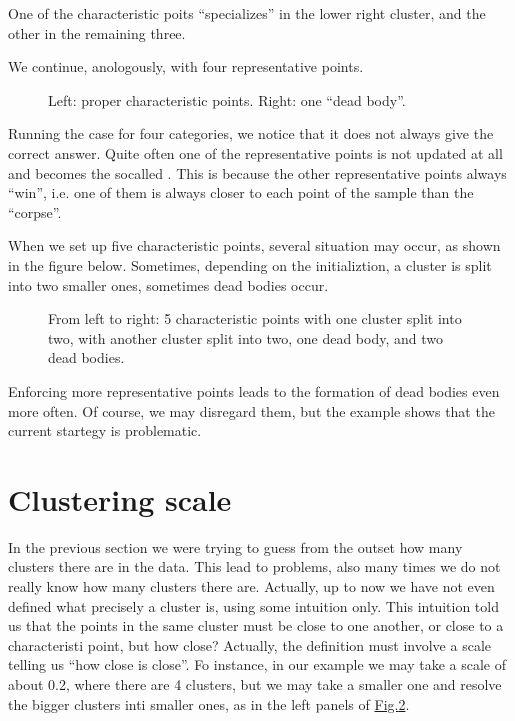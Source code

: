 \documentclass[letterpaper,10pt,english]{jupyterBook}
\let\sphinxpxdimen\pdfpxdimen\else\newdimen\sphinxpxdimen
\begin{document}
\noindent{}

\sphinxAtStartPar
One of the characteristic poits “specializes” in the lower right cluster, and the other in the remaining three.

\sphinxAtStartPar
We continue, anologously, with four representative points.

\begin{figure}[htbp]
\centering
\capstart

\noindent\sphinxincludegraphics[width=500\sphinxpxdimen]{{cl4_2}.jpg}
\caption{Left: proper characteristic points. Right: one “dead body”.}\label{\detokenize{docs/unsupervised:p-fig}}\end{figure}

\sphinxAtStartPar
Running the case for four categories, we notice that it does not always give the correct answer. Quite often one of the representative points is not updated at all and becomes the so\sphinxhyphen{}called . This is because the other representative points always “win”, i.e. one of them is always closer to each point of the sample than the “corpse”.

\sphinxAtStartPar
When we set up five characteristic points, several situation may occur, as shown in the figure below. Sometimes, depending on the initializtion, a cluster is split into two smaller ones, sometimes dead bodies occur.

\begin{figure}[htbp]
\centering
\capstart

\noindent\sphinxincludegraphics[width=870\sphinxpxdimen]{{cl5}.jpg}
\caption{From left to right: 5 characteristic points with one cluster split into two, with another cluster split into two, one dead body, and two dead bodies.}\label{\detokenize{docs/unsupervised:id1}}\end{figure}

\sphinxAtStartPar
Enforcing more representative points leads to the formation of dead bodies even more often. Of course, we may disregard them, but the example shows that the current startegy is problematic.


\section{Clustering scale}
\label{\detokenize{docs/unsupervised:clustering-scale}}
\sphinxAtStartPar
In the previous section we were trying to guess from the outset how many clusters there are in the data. This lead to problems, also many times we do not really know how many clusters there are. Actually, up to now we have not even defined what precisely a cluster is, using some intuition only. This intuition told us that the points in the same cluster must be close to one another, or close to a characteristi point, but how close? Actually, the definition must involve a scale telling us “how close is close”. Fo instance, in our example we may take a scale of about 0.2, where there are 4 clusters, but we may take a smaller one and resolve the bigger clusters inti smaller ones, as in the  left panels of \hyperref[\detokenize{docs/unsupervised:id1}]{Fig.\@ \ref{\detokenize{docs/unsupervised:id1}}}.
\end{document}
